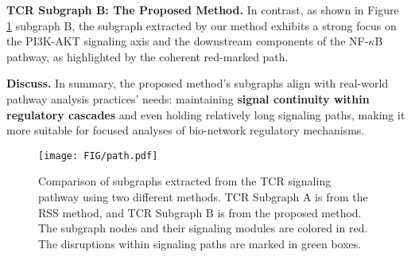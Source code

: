 \noindent\textbf{TCR Subgraph B: The Proposed Method. }  
In contrast, as shown in Figure \ref{fig:path} subgraph B, the subgraph extracted by our method exhibits a strong focus on the PI3K-AKT signaling axis \cite{PI3K} and the downstream components of the NF-\(\kappa\)B \cite{nfkb} pathway, as highlighted by the coherent red-marked path.

\noindent\textbf{Discuss. }  
In summary, the proposed method's subgraphs align with real-world pathway analysis practices' needs: maintaining \textbf{signal continuity within regulatory cascades} and even holding relatively long signaling paths, making it more suitable for focused analyses of bio-network regulatory mechanisms.

\begin{figure}[t]
\centering
\texttt{[image: FIG/path.pdf]}
\caption{Comparison of subgraphs extracted from the TCR signaling pathway using two different methods. TCR Subgraph A is from the RSS method, and TCR Subgraph B is from the proposed method. The subgraph nodes and their signaling modules are colored in red. The disruptions within signaling paths are marked in green boxes.}
\label{fig:path}
\end{figure}